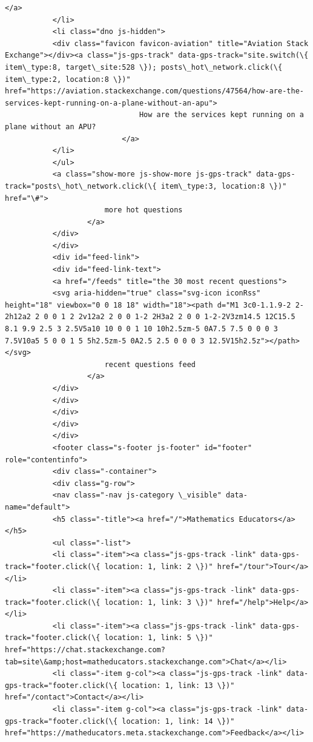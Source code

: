 \documentclass[11pt]{article}
\begin{document}
\begin{Verbatim}[commandchars=\\\{\}]
                           </a>
           </li>
           <li class="dno js-hidden">
           <div class="favicon favicon-aviation" title="Aviation Stack Exchange"></div><a class="js-gps-track" data-gps-track="site.switch(\{ item\_type:8, target\_site:528 \}); posts\_hot\_network.click(\{ item\_type:2, location:8 \})" href="https://aviation.stackexchange.com/questions/47564/how-are-the-services-kept-running-on-a-plane-without-an-apu">
                               How are the services kept running on a plane without an APU?
                           </a>
           </li>
           </ul>
           <a class="show-more js-show-more js-gps-track" data-gps-track="posts\_hot\_network.click(\{ item\_type:3, location:8 \})" href="\#">
                       more hot questions
                   </a>
           </div>
           </div>
           <div id="feed-link">
           <div id="feed-link-text">
           <a href="/feeds" title="the 30 most recent questions">
           <svg aria-hidden="true" class="svg-icon iconRss" height="18" viewbox="0 0 18 18" width="18"><path d="M1 3c0-1.1.9-2 2-2h12a2 2 0 0 1 2 2v12a2 2 0 0 1-2 2H3a2 2 0 0 1-2-2V3zm14.5 12C15.5 8.1 9.9 2.5 3 2.5V5a10 10 0 0 1 10 10h2.5zm-5 0A7.5 7.5 0 0 0 3 7.5V10a5 5 0 0 1 5 5h2.5zm-5 0A2.5 2.5 0 0 0 3 12.5V15h2.5z"></path></svg>
                       recent questions feed
                   </a>
           </div>
           </div>
           </div>
           </div>
           </div>
           <footer class="s-footer js-footer" id="footer" role="contentinfo">
           <div class="-container">
           <div class="g-row">
           <nav class="-nav js-category \_visible" data-name="default">
           <h5 class="-title"><a href="/">Mathematics Educators</a></h5>
           <ul class="-list">
           <li class="-item"><a class="js-gps-track -link" data-gps-track="footer.click(\{ location: 1, link: 2 \})" href="/tour">Tour</a></li>
           <li class="-item"><a class="js-gps-track -link" data-gps-track="footer.click(\{ location: 1, link: 3 \})" href="/help">Help</a></li>
           <li class="-item"><a class="js-gps-track -link" data-gps-track="footer.click(\{ location: 1, link: 5 \})" href="https://chat.stackexchange.com?tab=site\&amp;host=matheducators.stackexchange.com">Chat</a></li>
           <li class="-item g-col"><a class="js-gps-track -link" data-gps-track="footer.click(\{ location: 1, link: 13 \})" href="/contact">Contact</a></li>
           <li class="-item g-col"><a class="js-gps-track -link" data-gps-track="footer.click(\{ location: 1, link: 14 \})" href="https://matheducators.meta.stackexchange.com">Feedback</a></li>

\end{Verbatim}
\end{document}
